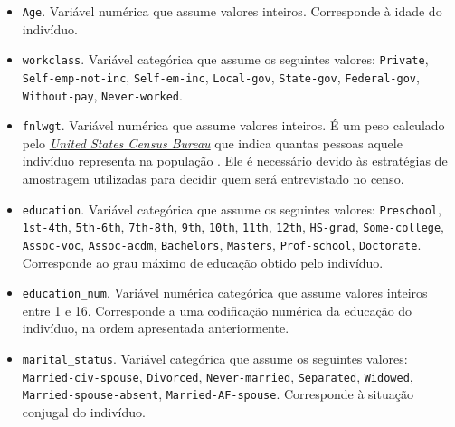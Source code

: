\documentclass[a4paper, 12pt]{article}
\begin{document}
\begin{itemize}
    \item \verb|Age|.
        Variável numérica que assume valores inteiros.
        Corresponde à idade do indivíduo.

    \item \verb|workclass|.
        Variável categórica que assume os seguintes valores:
        \verb|Private|, \verb|Self-emp-not-inc|, \verb|Self-em-inc|, \verb|Local-gov|, \verb|State-gov|, \verb|Federal-gov|, \verb|Without-pay|, \verb|Never-worked|.

    \item \verb|fnlwgt|.
        Variável numérica que assume valores inteiros.
        É um peso calculado pelo \href{https://www.census.gov/programs-surveys/cps/technical-documentation/methodology/weighting.html}{\emph{United States Census Bureau}} que indica quantas pessoas aquele indivíduo representa na população .
        Ele é necessário devido às estratégias de amostragem utilizadas para decidir quem será entrevistado no censo.

    \item \verb|education|.
        Variável categórica que assume os seguintes valores:
        \verb|Preschool|, \verb|1st-4th|, \verb|5th-6th|, \verb|7th-8th|, \verb|9th|, \verb|10th|, \verb|11th|, \verb|12th|, \verb|HS-grad|, \verb|Some-college|, \verb|Assoc-voc|, \verb|Assoc-acdm|, \verb|Bachelors|, \verb|Masters|, \verb|Prof-school|, \verb|Doctorate|.
        Corresponde ao grau máximo de educação obtido pelo indivíduo.

    \item \verb|education_num|.
        Variável numérica categórica que assume valores inteiros entre 1 e 16.
        Corresponde a uma codificação numérica da educação do indivíduo, na ordem apresentada anteriormente.

    \item \verb|marital_status|.
        Variável categórica que assume os seguintes valores:
        \verb|Married-civ-spouse|, \verb|Divorced|, \verb|Never-married|, \verb|Separated|, \verb|Widowed|, \verb|Married-spouse-absent|, \verb|Married-AF-spouse|.
        Corresponde à situação conjugal do indivíduo.

\end{itemize}

\printbibliography
\end{document}
